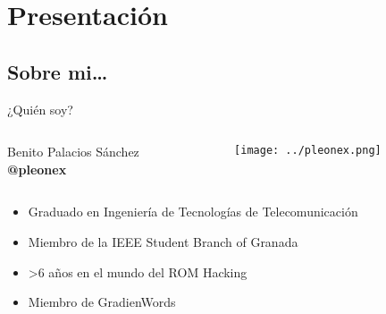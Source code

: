 \section{Presentación}
\subsection{Sobre mi\ldots}
\begin{frame}{¿Quién soy?}

    \begin{columns}
    \begin{column}{0.75\textwidth}
        \Large
        Benito Palacios Sánchez \\
        \textbf{@pleonex}
    \end{column}
    \begin{column}{0.25\textwidth}
        \texttt{[image: ../pleonex.png]}
    \end{column}
    \end{columns}

    \vfill
    \setlength{\leftmargini}{0em}
    \begin{itemize}
        \item<2-> Graduado en Ingeniería de Tecnologías de Telecomunicación
        \item<3-> Miembro de la IEEE Student Branch of Granada
        \item<4-> \textgreater 6 años en el mundo del ROM Hacking
        \item<5-> Miembro de GradienWords
    \end{itemize}
\end{frame}

